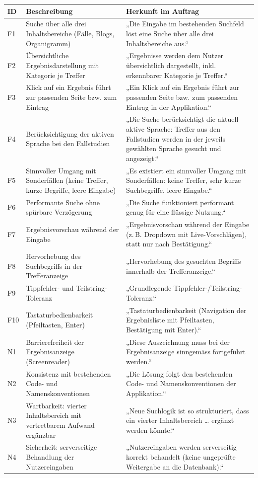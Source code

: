 \documentclass[11pt,a4paper]{article}
\begin{document}
{\small
\begin{longtable}{@{}l >{\raggedright\arraybackslash}p{6.2cm} >{\raggedright\arraybackslash}p{6.2cm}@{}}
\toprule
\textbf{ID} & \textbf{Beschreibung} & \textbf{Herkunft im Auftrag} \\
\midrule
\endhead
F1 & Suche über alle drei Inhaltsbereiche (Fälle, Blogs, Organigramm) & „Die Eingabe im bestehenden Suchfeld löst eine Suche über alle drei Inhaltsbereiche aus.“ \\
F2 & Übersichtliche Ergebnisdarstellung mit Kategorie je Treffer & „Ergebnisse werden dem Nutzer übersichtlich dargestellt, inkl. erkennbarer Kategorie je Treffer.“ \\
F3 & Klick auf ein Ergebnis führt zur passenden Seite bzw. zum Eintrag & „Ein Klick auf ein Ergebnis führt zur passenden Seite bzw. zum passenden Eintrag in der Applikation.“ \\
F4 & Berücksichtigung der aktiven Sprache bei den Fallstudien & „Die Suche berücksichtigt die aktuell aktive Sprache: Treffer aus den Fallstudien werden in der jeweils gewählten Sprache gesucht und angezeigt.“ \\
F5 & Sinnvoller Umgang mit Sonderfällen (keine Treffer, kurze Begriffe, leere Eingabe) & „Es existiert ein sinnvoller Umgang mit Sonderfällen: keine Treffer, sehr kurze Suchbegriffe, leere Eingabe.“ \\
F6 & Performante Suche ohne spürbare Verzögerung & „Die Suche funktioniert performant genug für eine flüssige Nutzung.“ \\
F7 & Ergebnisvorschau während der Eingabe & „Ergebnisvorschau während der Eingabe (z.\,B. Dropdown mit Live-Vorschlägen), statt nur nach Bestätigung.“ \\
F8 & Hervorhebung des Suchbegriffs in der Trefferanzeige & „Hervorhebung des gesuchten Begriffs innerhalb der Trefferanzeige.“ \\
F9 & Tippfehler- und Teilstring-Toleranz & „Grundlegende Tippfehler-/Teilstring-Toleranz.“ \\
F10 & Tastaturbedienbarkeit (Pfeiltasten, Enter) & „Tastaturbedienbarkeit (Navigation der Ergebnisliste mit Pfeiltasten, Bestätigung mit Enter).“ \\
N1 & Barrierefreiheit der Ergebnisanzeige (Screenreader) & „Diese Auszeichnung muss bei der Ergebnisanzeige sinngemäss fortgeführt werden.“ \\
N2 & Konsistenz mit bestehenden Code- und Namenskonventionen & „Die Lösung folgt den bestehenden Code- und Namenskonventionen der Applikation.“ \\
N3 & Wartbarkeit: vierter Inhaltsbereich mit vertretbarem Aufwand ergänzbar & „Neue Suchlogik ist so strukturiert, dass ein vierter Inhaltsbereich … ergänzt werden könnte.“ \\
N4 & Sicherheit: serverseitige Behandlung der Nutzereingaben & „Nutzereingaben werden serverseitig korrekt behandelt (keine ungeprüfte Weitergabe an die Datenbank).“ \\
\bottomrule
\end{longtable}
}
\end{document}
